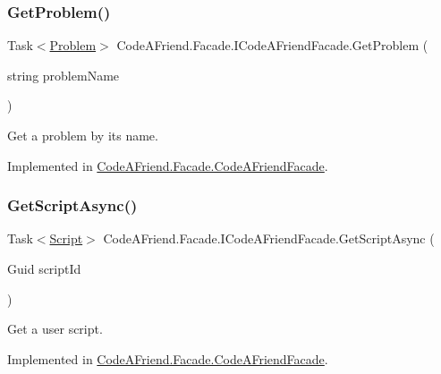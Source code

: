 \subsubsection{\texorpdfstring{Get\+Problem()}{GetProblem()}}
{\footnotesize\ttfamily Task$<$\mbox{\hyperlink{class_code_a_friend_1_1_data_model_1_1_problem}{Problem}}$>$ Code\+A\+Friend.\+Facade.\+I\+Code\+A\+Friend\+Facade.\+Get\+Problem (\begin{DoxyParamCaption}\item[{string}]{problem\+Name }\end{DoxyParamCaption})}



Get a problem by its name.



Implemented in \mbox{\hyperlink{class_code_a_friend_1_1_facade_1_1_code_a_friend_facade_a0fd5153f295a66388ef6a6d4880f32bd}{Code\+A\+Friend.\+Facade.\+Code\+A\+Friend\+Facade}}.

\mbox{\label{interface_code_a_friend_1_1_facade_1_1_i_code_a_friend_facade_af180522d16e16c3c7eb69324d87278c0}} 
\subsubsection{\texorpdfstring{Get\+Script\+Async()}{GetScriptAsync()}}
{\footnotesize\ttfamily Task$<$\mbox{\hyperlink{class_code_a_friend_1_1_data_model_1_1_script}{Script}}$>$ Code\+A\+Friend.\+Facade.\+I\+Code\+A\+Friend\+Facade.\+Get\+Script\+Async (\begin{DoxyParamCaption}\item[{Guid}]{script\+Id }\end{DoxyParamCaption})}



Get a user script.



Implemented in \mbox{\hyperlink{class_code_a_friend_1_1_facade_1_1_code_a_friend_facade_aaf0ac4c19567b0078140ab3d6a457e15}{Code\+A\+Friend.\+Facade.\+Code\+A\+Friend\+Facade}}.

\mbox{\label{interface_code_a_friend_1_1_facade_1_1_i_code_a_friend_facade_acc0a8e1606ff89320a2cdbcb69f9d338}} 
